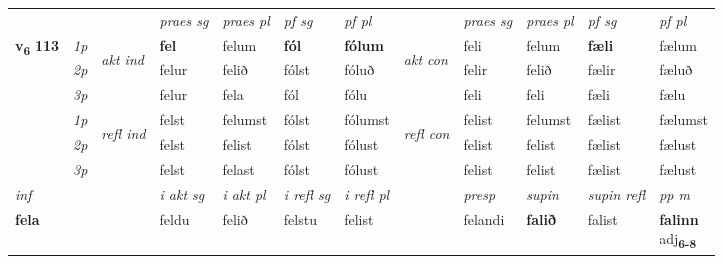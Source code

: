 \begin{longtable}[l]{X>{\footnotesize\itshape}llXXXXlXXXX}
 & &   & \textit{praes sg}  & \textit{praes pl}    & \textit{ pf sg} & \textit{pf pl} & & \textit{praes sg}  & \textit{praes pl}    & \textit{pf sg} & \textit{pf pl }  \\ \cmidrule{4-7} \cmidrule{9-12}
 \multirow{2}{*}{{{\textbf{v{\textsubscript{6}}} \Large{\textbf{113}}}}}  & 1p & \multirow{3}{*}{\begin{turn}{90}\textit{akt ind}\end{turn}} & \textbf{fel} & felum & \textbf{fól} & \textbf{fólum} & \multirow{3}{*}{\begin{turn}{90}\textit{akt con}\end{turn}} &feli & felum & \textbf{fæli} & fælum\\*
 & 2p &  &  felur  & felið & fólst & fóluð & & felir & felið & fælir & fæluð \\*
 & 3p &  & felur & fela & fól & fólu & & feli & feli& fæli & fælu \\*
\cmidrule{4-7} \cmidrule{9-12}
 & 1p & \multirow{3}{*}{\begin{turn}{90}\textit{refl ind}\end{turn}}  & felst & felumst & fólst & fólumst & \multirow{3}{*}{\begin{turn}{90}\textit{refl con}\end{turn}}  &felist & felumst & fælist & fælumst \\*
 & 2p &  & felst & felist & fólst & fólust & &felist & felist & fælist & fælust \\*
 & 3p  & & felst & felast & fólst & fólust & & felist & felist& fælist & fælust \\*
\cmidrule{4-7} \cmidrule{9-12}

   {\textit{inf}} & &  & \textit{i akt sg} & \textit{i akt pl} & \textit{i refl sg} & \textit{i refl pl} && \textit{presp} & \textit{supin} & \textit{supin refl} & \textit{pp m} \\*
  {\textbf{fela}} & && feldu  & felið & felstu & felist && felandi &  \textbf{falið} & falist & \specialcell{\textbf{falinn} \\ adj\textbf{\textsubscript{6-8}}} \\*

\midrule


\end{longtable}
